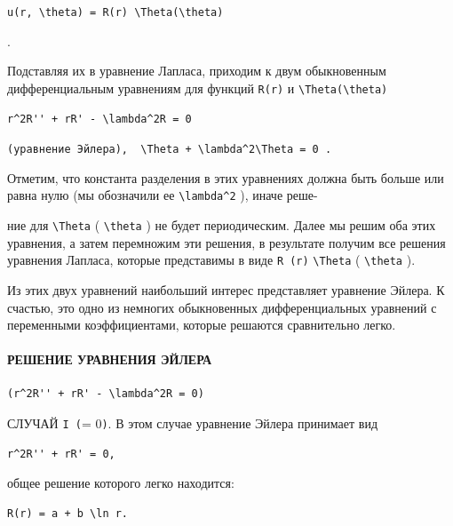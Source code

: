 \documentclass[
  ukrainian,
]{article}
\begin{document}
\texttt{u(r,\ \textbackslash{}theta)\ =\ R(r)\ \textbackslash{}Theta(\textbackslash{}theta)}

.

Подставляя их в уравнение Лапласа, приходим к двум обыкновенным
дифференциальным уравнениям для функций \texttt{R(r)} и
\texttt{\textbackslash{}Theta(\textbackslash{}theta)}

\begin{verbatim}
r^2R'' + rR' - \lambda^2R = 0
\end{verbatim}

\texttt{(уравнение\ Эйлера),\ \ \textquotesingle{}\textbackslash{}Theta\textquotesingle{}\textquotesingle{}\ +\ \textbackslash{}lambda\^{}2\textbackslash{}Theta\ =\ 0\textquotesingle{}\ .}

Отметим, что константа разделения в этих уравнениях должна быть больше
или равна нулю (мы обозначили ее \texttt{\textbackslash{}lambda\^{}2} ),
иначе реше-

ние для \texttt{\textbackslash{}Theta} ( \texttt{\textbackslash{}theta}
) не будет периодическим. Далее мы решим оба этих уравнения, а затем
перемножим эти решения, в результате получим все решения уравнения
Лапласа, которые представимы в виде \texttt{R\ (r)}
\texttt{\textbackslash{}Theta} ( \texttt{\textbackslash{}theta} ).

Из этих двух уравнений наибольший интерес представляет уравнение Эйлера.
К счастью, это одно из немногих обыкновенных дифференциальных уравнений
с переменными коэффициентами, которые решаются сравнительно легко.

\paragraph{РЕШЕНИЕ УРАВНЕНИЯ
ЭЙЛЕРА}\label{ux440ux435ux448ux435ux43dux438ux435-ux443ux440ux430ux432ux43dux435ux43dux438ux44f-ux44dux439ux43bux435ux440ux430}

\begin{verbatim}
(r^2R'' + rR' - \lambda^2R = 0)
\end{verbatim}

СЛУЧАЙ \texttt{I\ (}\lambda = 0\texttt{)}. В этом случае уравнение
Эйлера принимает вид

\begin{verbatim}
r^2R'' + rR' = 0,
\end{verbatim}

общее решение которого легко находится:

\begin{verbatim}
R(r) = a + b \ln r.
\end{verbatim}
\end{document}

